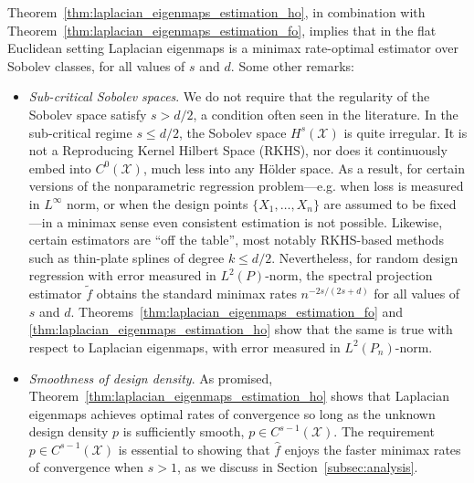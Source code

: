 \documentclass{article}
\newcommand{\1}{\mathbf{1}}
\newcommand{\Leb}{L}
\newcommand{\mc}[1]{\mathcal{#1}}
\newcommand{\wt}[1]{\widetilde{#1}}
\newcommand{\wh}[1]{\widehat{#1}}
\theoremstyle{alden}
\theoremstyle{aldenthm}
\theoremstyle{definition}
\theoremstyle{remark}
\begin{document}
Theorem~\ref{thm:laplacian_eigenmaps_estimation_ho}, in combination with Theorem~\ref{thm:laplacian_eigenmaps_estimation_fo}, implies that in the flat Euclidean setting Laplacian eigenmaps is a minimax rate-optimal estimator over Sobolev classes, for all values of $s$ and $d$. Some other remarks:
\begin{itemize}
	\item \emph{Sub-critical Sobolev spaces}. We do not require that the regularity of the Sobolev space satisfy $s > d/2$, a condition often seen in the literature. In the sub-critical regime $s \leq d/2$, the Sobolev space $H^s(\mc{X})$ is quite irregular. It is not a Reproducing Kernel Hilbert Space (RKHS), nor does it continuously embed into $C^0(\mc{X})$, much less into any H\"{o}lder space. As a result, for certain versions of the nonparametric regression problem---e.g. when loss is measured in $\Leb^{\infty}$ norm, or when the design points $\{X_1,\ldots,X_n\}$ are assumed to be fixed---in a minimax sense even consistent estimation is not possible. Likewise, certain estimators are ``off the table'', most notably RKHS-based methods such as thin-plate splines of degree $k \leq d/2$. Nevertheless, for random design regression with error measured in $\Leb^2(P)$-norm, the spectral projection estimator $\wt{f}$ obtains the standard minimax rates $n^{-2s/(2s + d)}$ for all values of $s$ and $d$. Theorems~\ref{thm:laplacian_eigenmaps_estimation_fo} and \ref{thm:laplacian_eigenmaps_estimation_ho} show that the same is true with respect to Laplacian eigenmaps, with error measured in $\Leb^2(P_n)$-norm.
	\item \emph{Smoothness of design density}. As promised,  Theorem~\ref{thm:laplacian_eigenmaps_estimation_ho} shows that Laplacian eigenmaps achieves optimal rates of convergence so long as the unknown design density $p$ is sufficiently smooth, $p \in C^{s - 1}(\mc{X})$. The requirement $p \in C^{s - 1}(\mc{X})$ is essential to showing that $\wh{f}$ enjoys the faster minimax rates of convergence when $s > 1$,  as we discuss in Section~\ref{subsec:analysis}. 
\end{itemize}
\end{document}
